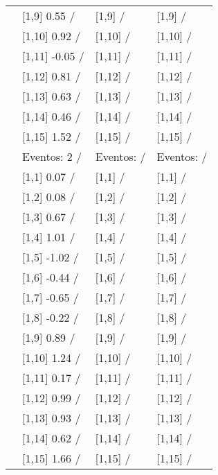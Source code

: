 \begin{table}
\begin{tabular}[t]{llll}
\addlinespace
 & {}[1,9] 0.55  / & {}[1,9]  / & {}[1,9]  /\\
 & {}[1,10] 0.92  / & {}[1,10]  / & {}[1,10]  /\\
 & {}[1,11] -0.05  / & {}[1,11]  / & {}[1,11]  /\\
 & {}[1,12] 0.81  / & {}[1,12]  / & {}[1,12]  /\\
 & {}[1,13] 0.63  / & {}[1,13]  / & {}[1,13]  /\\
\addlinespace
 & {}[1,14] 0.46  / & {}[1,14]  / & {}[1,14]  /\\
 & {}[1,15] 1.52  / & {}[1,15]  / & {}[1,15]  /\\
 & Eventos:  2 / & Eventos:   / & Eventos:   /\\
 & {}[1,1] 0.07  / & {}[1,1]  / & {}[1,1]  /\\
 & {}[1,2] 0.08  / & {}[1,2]  / & {}[1,2]  /\\
\addlinespace
 & {}[1,3] 0.67  / & {}[1,3]  / & {}[1,3]  /\\
 & {}[1,4] 1.01  / & {}[1,4]  / & {}[1,4]  /\\
 & {}[1,5] -1.02  / & {}[1,5]  / & {}[1,5]  /\\
 & {}[1,6] -0.44  / & {}[1,6]  / & {}[1,6]  /\\
 & {}[1,7] -0.65  / & {}[1,7]  / & {}[1,7]  /\\
\addlinespace
500 & {}[1,8] -0.22  / & {}[1,8]  / & {}[1,8]  /\\
 & {}[1,9] 0.89  / & {}[1,9]  / & {}[1,9]  /\\
 & {}[1,10] 1.24  / & {}[1,10]  / & {}[1,10]  /\\
 & {}[1,11] 0.17  / & {}[1,11]  / & {}[1,11]  /\\
 & {}[1,12] 0.99  / & {}[1,12]  / & {}[1,12]  /\\
\addlinespace
 & {}[1,13] 0.93  / & {}[1,13]  / & {}[1,13]  /\\
 & {}[1,14] 0.62  / & {}[1,14]  / & {}[1,14]  /\\
 & {}[1,15] 1.66  / & {}[1,15]  / & {}[1,15]  /\\
\bottomrule
\end{tabular}
\end{table}
